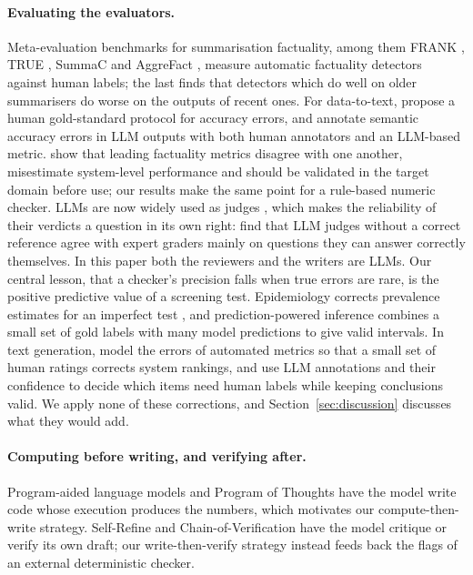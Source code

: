 \documentclass[11pt]{article}
\begin{document}
\paragraph{Evaluating the evaluators.} Meta-evaluation benchmarks for summarisation factuality, among them FRANK \citep{pagnoni2021frank}, TRUE \citep{honovich2022true}, SummaC \citep{laban2022summac} and AggreFact \citep{tang2023understanding}, measure automatic factuality detectors against human labels; the last finds that detectors which do well on older summarisers do worse on the outputs of recent ones. For data-to-text, \citet{thomson2020gold} propose a human gold-standard protocol for accuracy errors, and \citet{kasner2024beyond} annotate semantic accuracy errors in LLM outputs with both human annotators and an LLM-based metric. \citet{godbole2025verify} show that leading factuality metrics disagree with one another, misestimate system-level performance and should be validated in the target domain before use; our results make the same point for a rule-based numeric checker. LLMs are now widely used as judges \citep{zheng2023judging}, which makes the reliability of their verdicts a question in its own right: \citet{krumdick2026nofree} find that LLM judges without a correct reference agree with expert graders mainly on questions they can answer correctly themselves. In this paper both the reviewers and the writers are LLMs. Our central lesson, that a checker's precision falls when true errors are rare, is the positive predictive value of a screening test. Epidemiology corrects prevalence estimates for an imperfect test \citep{rogan1978estimating}, and prediction-powered inference \citep{angelopoulos2023ppi} combines a small set of gold labels with many model predictions to give valid intervals. In text generation, \citet{deriu2023correction} model the errors of automated metrics so that a small set of human ratings corrects system rankings, and \citet{gligoric2025unconfident} use LLM annotations and their confidence to decide which items need human labels while keeping conclusions valid. We apply none of these corrections, and Section~\ref{sec:discussion} discusses what they would add.

\paragraph{Computing before writing, and verifying after.} Program-aided language models \citep{gao2023pal} and Program of Thoughts \citep{chen2023pot} have the model write code whose execution produces the numbers, which motivates our compute-then-write strategy. Self-Refine \citep{madaan2023selfrefine} and Chain-of-Verification \citep{dhuliawala2024cove} have the model critique or verify its own draft; our write-then-verify strategy instead feeds back the flags of an external deterministic checker.
\end{document}
